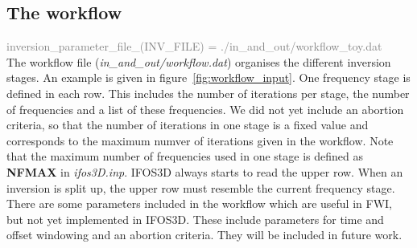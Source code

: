 \subsection{The workflow}
\textcolor {Gray}{inversion\_parameter\_file\_(INV\_FILE) = ./in\_and\_out/workflow\_toy.dat}\vspace{0.1cm}\\
The workflow file (\textit{in\_and\_out/workflow.dat}) organises the different inversion stages. An example is given in figure~\ref{fig:workflow_input}. One frequency stage is defined in each row. This includes the number of iterations per stage, the number of frequencies and a list of these frequencies. We did not yet include an abortion criteria, so that the number of iterations in one stage is a fixed value and corresponds to the maximum numver of iterations given in the workflow. Note that the maximum number of frequencies used in one stage is defined as \textbf{NFMAX} in \textit{ifos3D.inp}. IFOS3D always starts to read the upper row. When an inversion is split up, the upper row must resemble the current frequency stage.\\
There are some parameters included in the workflow which are useful in FWI, but not yet implemented in IFOS3D. These include parameters for time and offset windowing and an abortion criteria. They will be included in future work.
